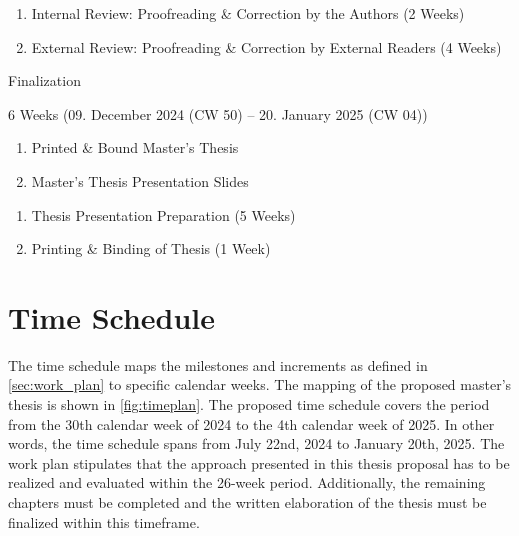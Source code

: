 \begin{description}
\begin{description}[style=multiline, leftmargin=\widthof{\textbf{Deliverables:}}]
        \item[Increments:]
        \begin{enumerate}[label=\arabic*), leftmargin=\widthof{a)}+\labelsep]
            \item Internal Review: Proofreading \& Correction by the Authors (2 Weeks)
            \item External Review: Proofreading \& Correction by External Readers (4 Weeks)
        \end{enumerate}
    \end{description}
    \item[Milestone VI:] Finalization
    \begin{description}[style=multiline, leftmargin=\widthof{\textbf{Deliverables:}}]
        \item[Duration:] 6 Weeks (09. December 2024 (CW 50) -- 20. January 2025 (CW 04))
        \item[Deliverables:]
        \begin{enumerate}[label=\alph*), leftmargin=\widthof{a)}+\labelsep]
            \item Printed \& Bound Master's Thesis
            \item Master's Thesis Presentation Slides
        \end{enumerate}
        \item[Increments:]
        \begin{enumerate}[label=\arabic*), leftmargin=\widthof{a)}+\labelsep]
            \item Thesis Presentation Preparation (5 Weeks)
            \item Printing \& Binding of Thesis (1 Week)
        \end{enumerate}
    \end{description}
\end{description}

\section{Time Schedule}
\label{sec:time_schedule}
The time schedule maps the milestones and increments as defined in \autoref{sec:work_plan} to specific calendar weeks.
The mapping of the proposed master's thesis is shown in \autoref{fig:timeplan}.
The proposed time schedule covers the period from the 30th calendar week of 2024 to the 4th calendar week of 2025.
In other words, the time schedule spans from July 22nd, 2024 to January 20th, 2025.
The work plan stipulates that the approach presented in this thesis proposal has to be realized and evaluated within the 26-week period.
Additionally, the remaining chapters must be completed and the written elaboration of the thesis must be finalized within this timeframe.

